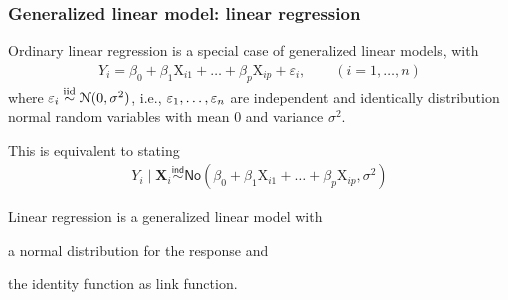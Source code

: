 \documentclass{beamer}
\begin{document}
\begin{frame}
\frametitle{Generalized linear model: linear regression}
\bi
\item Ordinary linear regression is a special case of generalized linear models, with
\begin{align*}
Y_i = \beta_0+ \beta_1 \mathrm{X}_{i1}+\ldots+\beta_p \mathrm{X}_{ip} + \varepsilon_i, \qquad (i=1, \ldots, n)
\end{align*}
where $\varepsilon_i \stackrel{\textnormal{iid}}{\sim} \mathcal{N}(0, \sigma^2)$, i.e., $\varepsilon_1, \ldots, \varepsilon_n$ are independent and identically distribution normal random variables with mean $0$ and variance $\sigma^2$.
\item This is equivalent to stating
\begin{align*}
Y_i\mid \mathbf{X}_i \stackrel{\mathsf{ind}}{\sim} \mathsf{No}(\beta_0+ \beta_1 \mathrm{X}_{i1}+\ldots+\beta_p \mathrm{X}_{ip}, \sigma^2)
\end{align*}
\item Linear regression is a generalized linear model with
\bi
 
\item a normal distribution for the response and
\item the identity function as link function.
\ei 
\ei
\end{frame} 
\end{document}
